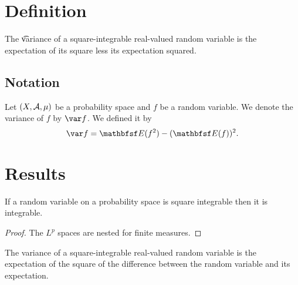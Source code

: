 
\section*{Definition}

The \t{variance} of a square-integrable real-valued random variable is the expectation of its square less its expectation squared.

\subsection*{Notation}

Let $(X, \mathcal{A}, \mu )$
be a probability space
and $f$ be a random variable.
We denote the variance
of $f$ by $\var f$.
We defined it by
  \[
\var f = \E (f^2) - (\E (f))^2.
  \]

\section*{Results}

\begin{prop}
If a random
variable on a probability
space is square integrable
then it is integrable.
\begin{proof}
The $L^p$ spaces are nested
for finite measures.
\end{proof}
\end{prop}

\begin{prop}
The variance of a square-integrable real-valued random variable is the expectation of the square of the difference between the random variable and its expectation.
\end{prop}

\blankpage